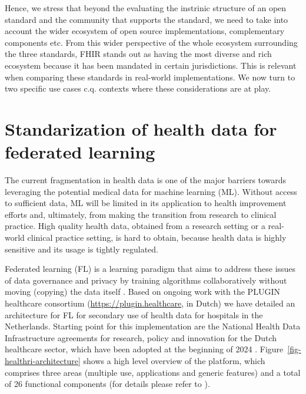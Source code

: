 \documentclass[
  authoryear]{elsarticle}
\begin{document}
Hence, we stress that beyond the evaluating the instrinic structure of
an open standard and the community that supports the standard, we need
to take into account the wider ecosystem of open source implementations,
complementary components etc. From this wider perspective of the whole
ecosystem surrounding the three standards, FHIR stands out as having the
most diverse and rich ecosystem because it has been mandated in certain
jurisdictions. This is relevant when comparing these standards in
real-world implementations. We now turn to two specific use cases c.q.
contexts where these considerations are at play.

\section{Standarization of health data for federated
learning}\label{standarization-of-health-data-for-federated-learning}

The current fragmentation in health data is one of the major barriers
towards leveraging the potential medical data for machine learning (ML).
Without access to sufficient data, ML will be limited in its application
to health improvement efforts and, ultimately, from making the
transition from research to clinical practice. High quality health data,
obtained from a research setting or a real-world clinical practice
setting, is hard to obtain, because health data is highly sensitive and
its usage is tightly regulated.

Federated learning (FL) is a learning paradigm that aims to address
these issues of data governance and privacy by training algorithms
collaboratively without moving (copying) the data itself
\citep{rieke2020future, teo2024federated}. Based on ongoing work with
the PLUGIN healthcare consortium (\url{https://plugin.healthcare}, in
Dutch) we have detailed an architecture for FL for secondary use of
health data for hospitals in the Netherlands. Starting point for this
implementation are the National Health Data Infrastructure agreements
for research, policy and innovation for the Dutch healthcare sector,
which have been adopted at the beginning of 2024
\citep{healthri2024agreements}. Figure~\ref{fig-healthri-architecture}
shows a high level overview of the platform, which comprises three areas
(multiple use, applications and generic features) and a total of 26
functional components (for details please refer to
\citep{healthri2024agreements}).
\end{document}
